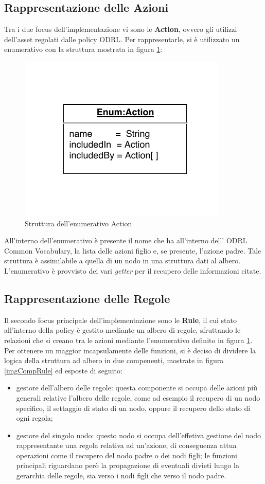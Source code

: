 \documentclass[12pt,a4paper,twoside]{book}
\begin{document}
\subsection{Rappresentazione delle Azioni}\label{enumAction}
Tra i due focus dell'implementazione vi sono le \textbf{Action}, ovvero gli utilizzi dell'asset regolati dalle policy ODRL. Per rappresentarle, si è utilizzato un enumerativo con la struttura mostrata in figura \ref{imgActionEnum}:
\begin{figure}[H]
\centering
\includegraphics[scale=1.00]{../immagini/enumAction}
\caption{Struttura dell'enumerativo Action}
\label{imgActionEnum}
\end{figure}
All'interno dell'enumerativo è presente il nome che ha all'interno dell' ODRL Common Vocabulary, la lista delle azioni figlio e, se presente, l'azione padre. Tale struttura è assimilabile a quella di un nodo in una struttura dati al albero. L'enumerativo è provvisto dei vari \textit{getter} per il recupero delle informazioni citate.
\subsection{Rappresentazione delle Regole}
Il secondo focus principale dell'implementazione sono le \textbf{Rule}, il cui stato all'interno della policy è gestito mediante un albero di regole, sfruttando le relazioni che si creano tra le azioni mediante l'enumerativo definito in figura \ref{imgActionEnum}. Per ottenere un maggior incapsulamente delle funzioni, si è deciso di dividere la logica della struttura ad albero in due compenenti, mostrate in figura \ref{imgCompRule} ed esposte di seguito:
\begin{itemize}
\item gestore dell'albero delle regole: questa componente si occupa delle azioni più generali relative l'albero delle regole, come ad esempio il recupero di un nodo specifico, il settaggio di stato di un nodo, oppure il recupero dello stato di ogni regola;
\item gestore del singolo nodo: questo nodo si occupa dell'effetiva gestione del nodo rappresentante una regola relativa ad un'azione, di conseguenza attua operazioni come il recupero del nodo padre o dei nodi figli; le funzioni principali riguardano però la propagazione di eventuali divieti lungo la gerarchia delle regole, sia verso i nodi figli che verso il nodo padre.
\end{itemize}
\end{document}
